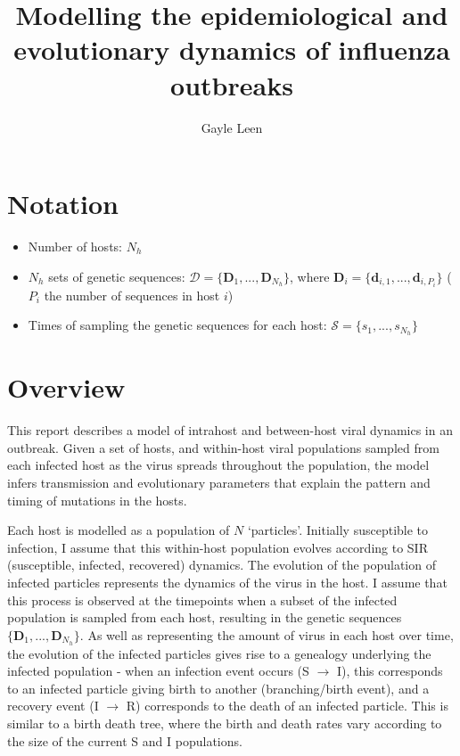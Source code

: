\documentclass[]{report}
\title{Modelling the epidemiological and evolutionary dynamics of influenza outbreaks}
\author{Gayle Leen}
\begin{document}
\maketitle

\begin{abstract}

\end{abstract}
\section{Notation}
\begin{itemize}
\item Number of hosts: $N_h$
\item $N_h$ sets of genetic sequences: $\mathcal{D} = \{\mathbf{D}_1,...,\mathbf{D}_{N_h}\}$, where $\mathbf{D}_i = \{\mathbf{d}_{i,1},...,\mathbf{d}_{i,P_i}\}$ ($P_i$ the number of sequences in host $i$)
\item Times of sampling the genetic sequences for each host: $\mathcal{S} = \{s_1,...,s_{N_h}\}$
\end{itemize}

\section{Overview}
This report describes a model of intrahost and between-host viral dynamics in an outbreak. Given a set of hosts, and within-host viral populations sampled from each infected host as the virus spreads throughout the population, the model infers transmission and evolutionary parameters                                                                   
that explain the pattern and timing of mutations in the hosts.

Each host is modelled as a population of $N$ `particles'. Initially susceptible to infection, I assume that this within-host population evolves according to SIR (susceptible, infected, recovered) dynamics. The evolution of the population of infected particles represents the dynamics of the virus in the host. I assume that this process is observed at the timepoints when a subset of the infected population is sampled from each host, resulting in the genetic sequences $\{\mathbf{D}_1,...,\mathbf{D}_{N_h}\}$. As well as representing the amount of virus in each host over time, the evolution of the infected particles gives rise to a genealogy underlying the infected population - when an infection event occurs (S $\rightarrow$ I), this corresponds to an infected particle giving birth to another (branching/birth event),
and a recovery event (I $\rightarrow$ R) corresponds to the death of an infected particle. This is similar to a birth death tree, where the birth and death rates vary according to the size of the current S and I populations.
\end{document}

